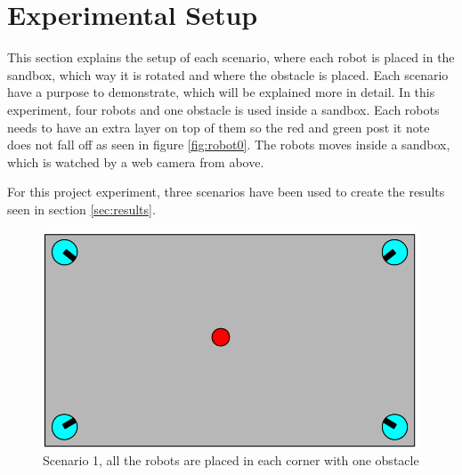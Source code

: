 
\section{Experimental Setup}
\label{sec:experimentalSetup}
This section explains the setup of each scenario, where each robot is placed in the sandbox, which way it is rotated and where the obstacle is placed. Each scenario have a purpose to demonstrate, which will be explained more in detail.
In this experiment, four robots and one obstacle is used inside a sandbox. Each robots needs to have an extra layer on top of them so the red and green post it note does not fall off as seen in figure \ref{fig:robot0}. The robots moves inside a sandbox, which is watched by a web camera from above.

For this project experiment, three scenarios have been used to create the results seen in section \ref{sec:results}.
\label{sec:scenario}
\begin{figure}[h]
\begin{center}
\includegraphics[width=0.8\linewidth]{figs/scenario0}
\end{center}
\caption[scenario 1]{Scenario 1, all the robots are placed in each corner with one obstacle}
\label{fig:scenario1}
\end{figure}

